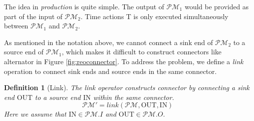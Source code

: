 \documentclass[conference, a4paper]{IEEEtran}
\newtheorem{definition}{Definition}
\newcommand{\OUT}[0]{\mbox{OUT}}
\newcommand{\IN}[0]{\mbox{IN}}
\begin{document}
The idea in \emph{production} is quite simple. The output of $\mathcal{PM}_1$ would be provided as part of the
input of $\mathcal{PM}_2$. Time actions T is only executed simultaneously between $\mathcal{PM}_1$ and $\mathcal{PM}_2$.

As mentioned in the notation above, we cannot connect a sink end of $\mathcal{PM}_2$ to a source end of
$\mathcal{PM}_1$, which makes it difficult to construct connectors like alternator in Figure
\ref{fig:reoconnector}. To address the problem, we define a \emph{link} operation to connect sink
ends and source ends in the same connector.

\begin{definition}[Link]
  The \emph{link} operator constructs connector by connecting a sink end $\OUT$ to a source end $\IN$
  within the same connector.   
  \[
  \mathcal{PM}' = link(\mathcal{PM}, \OUT, \IN)
  \]
  Here we assume that $\IN\in \mathcal{PM}.I$ and $\OUT\in \mathcal{PM}.O$.


\end{definition}
\end{document}
